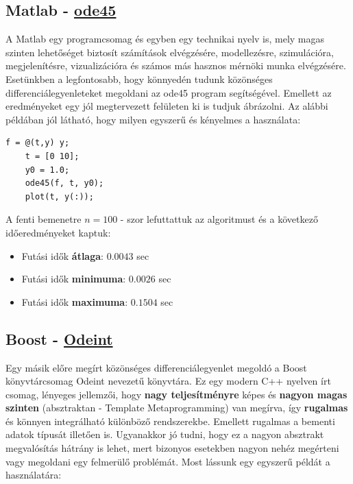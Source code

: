 \subsection {Matlab - \href{https://www.mathworks.com/help/matlab/ref/ode45.html}{ode45}} \label{MatlabOde45}

A Matlab egy programcsomag és egyben egy technikai nyelv is, mely magas szinten lehetőséget biztosít számítások elvégzésére, modellezésre, szimulációra, megjelenítésre, vizualizációra és számos más hasznos mérnöki munka elvégzésére. Esetünkben a legfontosabb, hogy könnyedén tudunk közönséges differenciálegyenleteket megoldani az ode45 program segítségével. Emellett az eredményeket egy jól megtervezett felületen ki is tudjuk ábrázolni. Az alábbi példában jól látható, hogy milyen egyszerű és kényelmes a használata:

\begin{lstlisting}[caption={Matlab példakód diff. egyenlet megoldására.}, captionpos=b]
	f = @(t,y) y;
	t = [0 10];
	y0 = 1.0;
	ode45(f, t, y0);
	plot(t, y(:));
\end{lstlisting}


A fenti bemenetre $ n = 100 $ - szor lefuttattuk az algoritmust és a következő időeredményeket kaptuk:
\begin{itemize}
	\item Futási idők \textbf{átlaga}: $ 0.0043 $ sec
	\item Futási idők \textbf{minimuma}: $ 0.0026 $ sec
	\item Futási idők \textbf{maximuma}: $ 0.1504 $ sec
\end{itemize}




\begin{center}
\end{center}

\subsection {Boost - \href{http://headmyshoulder.github.io/odeint-v2/}{Odeint}} \label{BoostOdeint}

Egy másik előre megírt közönséges differenciálegyenlet megoldó a Boost könyvtárcsomag Odeint nevezetű könyvtára. Ez egy modern C++ nyelven írt csomag, lényeges jellemzői, hogy \textbf{nagy teljesítményre} képes és \textbf{nagyon magas szinten} (absztraktan - Template Metaprogramming) van megírva, így \textbf{rugalmas} és könnyen integrálható különböző rendszerekbe. Emellett rugalmas a bementi adatok típusát illetően is. Ugyanakkor jó tudni, hogy ez a nagyon absztrakt megvalósítás hátrány is lehet, mert bizonyos esetekben nagyon nehéz megérteni vagy megoldani egy felmerülő problémát. Most lássunk egy egyszerű példát a használatára:

